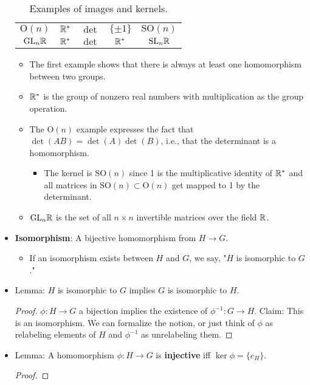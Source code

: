 \documentclass[../notes.tex]{subfiles}
\begin{document}
\begin{itemize}
\begin{table}[H]
\begin{tabular}{c|c|c|c|c}
            $\text{O}(n)$ & $\mathbb{R}^*$ & $\det$ & $\{\pm 1\}$ & $\text{SO}(n)$\\
            $\text{GL}_n\mathbb{R}$ & $\mathbb{R}^*$ & $\det$ & $\mathbb{R}^*$ & $\text{SL}_n\mathbb{R}$\\
        \end{tabular}
        \caption{Examples of images and kernels.}
        \label{tab:ImKer}
    \end{table}
    \begin{itemize}
        \item The first example shows that there is always at least one homomorphism between two groups.
        \item $\mathbb{R}^*$ is the group of nonzero real numbers with multiplication as the group operation.
        \item The $\text{O}(n)$ example expresses the fact that $\det(AB)=\det(A)\det(B)$, i.e., that the determinant is a homomorphism.
        \begin{itemize}
            \item The kernel is $\text{SO}(n)$ since 1 is the multiplicative identity of $\mathbb{R}^*$ and all matrices in $\text{SO}(n)\subset\text{O}(n)$ get mapped to 1 by the determinant.
        \end{itemize}
        \item $\text{GL}_n\mathbb{R}$ is the set of all $n\times n$ invertible matrices over the field $\mathbb{R}$.
    \end{itemize}
    \item \textbf{Isomorphism}: A bijective homomorphism from $H\to G$.
    \begin{itemize}
        \item If an isomorphism exists between $H$ and $G$, we say, "$H$ is isomorphic to $G$."
    \end{itemize}
    \item Lemma: $H$ is isomorphic to $G$ implies $G$ is isomorphic to $H$.
    \begin{proof}
        $\phi:H\to G$ a bijection implies the existence of $\phi^{-1}:G\to H$. Claim: This is an isomorphism. We can formalize the notion, or just think of $\phi$ as relabeling elements of $H$ and $\phi^{-1}$ as unrelabeling them.
    \end{proof}
    \item Lemma: A homomorphism $\phi:H\to G$ is \textbf{injective} iff $\ker\phi=\{e_H\}$.
    \begin{proof}

\end{proof}
\end{itemize}
\end{document}
